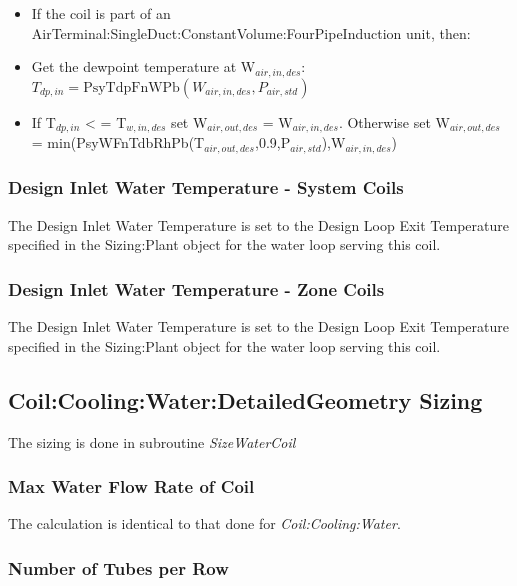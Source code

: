 \begin{itemize}
\tightlist
\item
  If the coil is part of an AirTerminal:SingleDuct:ConstantVolume:FourPipeInduction unit, then:
\item
  Get the dewpoint temperature at W$_{air,in,des}$: $T_{dp,in} = \text{PsyTdpFnWPb}\left(W_{air,in,des},P_{air,std}\right)$
\item
  If T$_{dp,in}$ < = T$_{w,in,des}$ set W$_{air,out,des}$ = W$_{air,in,des}$. Otherwise set W$_{air,out,des}$ = min(PsyWFnTdbRhPb(T$_{air,out,des}$,0.9,P$_{air,std}$),W$_{air,in,des}$)
\end{itemize}

\subsubsection{Design Inlet Water Temperature - System Coils}\label{design-inlet-water-temperature---system-coils}

The Design Inlet Water Temperature is set to the Design Loop Exit Temperature specified in the Sizing:Plant object for the water loop serving this coil.

\subsubsection{Design Inlet Water Temperature - Zone Coils}\label{design-inlet-water-temperature---zone-coils}

The Design Inlet Water Temperature is set to the Design Loop Exit Temperature specified in the Sizing:Plant object for the water loop serving this coil.

\subsection{Coil:Cooling:Water:DetailedGeometry Sizing}\label{coilcoolingwaterdetailedgeometry-sizing}

The sizing is done in subroutine \emph{SizeWaterCoil}

\subsubsection{Max Water Flow Rate of Coil}\label{max-water-flow-rate-of-coil}

The calculation is identical to that done for \emph{Coil:Cooling:Water}.

\subsubsection{Number of Tubes per Row}\label{number-of-tubes-per-row}


